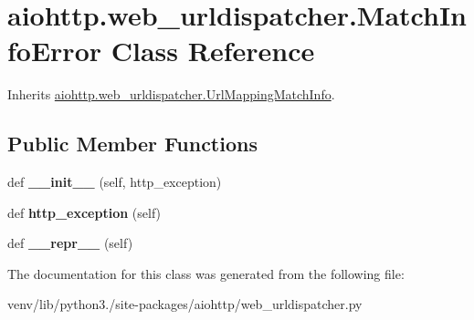 \hypertarget{classaiohttp_1_1web__urldispatcher_1_1_match_info_error}{}\section{aiohttp.\+web\+\_\+urldispatcher.\+Match\+Info\+Error Class Reference}
\label{classaiohttp_1_1web__urldispatcher_1_1_match_info_error}


Inherits \hyperlink{classaiohttp_1_1web__urldispatcher_1_1_url_mapping_match_info}{aiohttp.\+web\+\_\+urldispatcher.\+Url\+Mapping\+Match\+Info}.

\subsection*{Public Member Functions}
\begin{DoxyCompactItemize}
\item 
\mbox{\label{classaiohttp_1_1web__urldispatcher_1_1_match_info_error_a12c959dd9dd33e12a06223455e38a6a3}} 
def {\bfseries \+\_\+\+\_\+init\+\_\+\+\_\+} (self, http\+\_\+exception)
\item 
\mbox{\label{classaiohttp_1_1web__urldispatcher_1_1_match_info_error_a58692aaa635564364b613a70bb4b53eb}} 
def {\bfseries http\+\_\+exception} (self)
\item 
\mbox{\label{classaiohttp_1_1web__urldispatcher_1_1_match_info_error_acc00fa9cfe63371f300146df29de121a}} 
def {\bfseries \+\_\+\+\_\+repr\+\_\+\+\_\+} (self)
\end{DoxyCompactItemize}


The documentation for this class was generated from the following file\+:\begin{DoxyCompactItemize}
\item 
venv/lib/python3./site-\/packages/aiohttp/web\+\_\+urldispatcher.\+py\end{DoxyCompactItemize}
